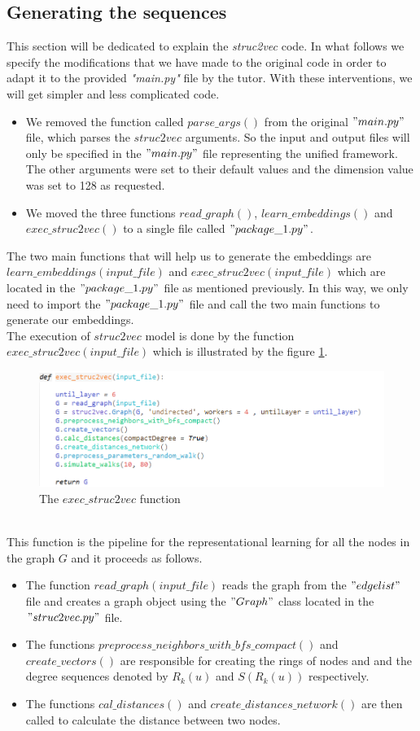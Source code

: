 \documentclass[a4paper,13pt]{article}
\begin{document}
\subsection{Generating the sequences}
This section will be dedicated to explain the \textit{struc2vec} code. In what follows we specify the modifications that we have made to the original code in order to adapt it to the provided \textit{"main.py"} file by the tutor. With these interventions, we will get simpler and less complicated code.
\begin{itemize}
\item We removed the function called $parse\_args()$ from the original $"main.py"$ file, which parses the $struc2vec$ arguments. So the input and output files will only be specified in the $"main.py"$ file representing the unified framework. The other arguments were set to their default values and the dimension value was set to 128 as requested.
\item We moved the three functions $read\_graph()$, $learn\_embeddings()$ and $exec\_struc2vec()$ to a single file called $"package\_1.py"$.
\end{itemize}
The two main functions that will help us to generate the embeddings are $learn\_embeddings(input\_file)$ and $exec\_struc2vec(input\_file)$ which are located in the $"package\_1.py"$ file as mentioned previously. In this way, we only need to import the $"package\_1.py"$ file and call the two main functions to generate our embeddings.\\
The execution of $struc2vec$ model is done by the function $exec\_struc2vec(input\_file)$ which is illustrated by the figure \ref{fig:exec}.
\FloatBarrier
\begin{figure}[h!]
  \includegraphics[scale=0.63]{screen-shots/exec.PNG}
  \centering
  \caption{The $exec\_struc2vec$ function}
  \label{fig:exec}
\end{figure}
\FloatBarrier
\\This function is the pipeline for the representational learning for all the nodes in the graph $G$ and it proceeds as follows.
\begin{itemize}
    \item The function $read\_graph(input\_file)$ reads the graph from the $"edgelist"$ file and creates a graph object using the $"Graph"$ class located in the $"struc2vec.py"$ file.
    \item The functions $preprocess\_neighbors\_with\_bfs\_compact()$ and $create\_vectors()$ are responsible for creating the rings of nodes and and the degree sequences denoted by $R_{k}(u)$ and $S(R_{k}(u))$ respectively.
    \item The functions $cal\_distances()$ and $create\_distances\_network()$ are then called to calculate the distance between two nodes.
\end{itemize}
\end{document}
